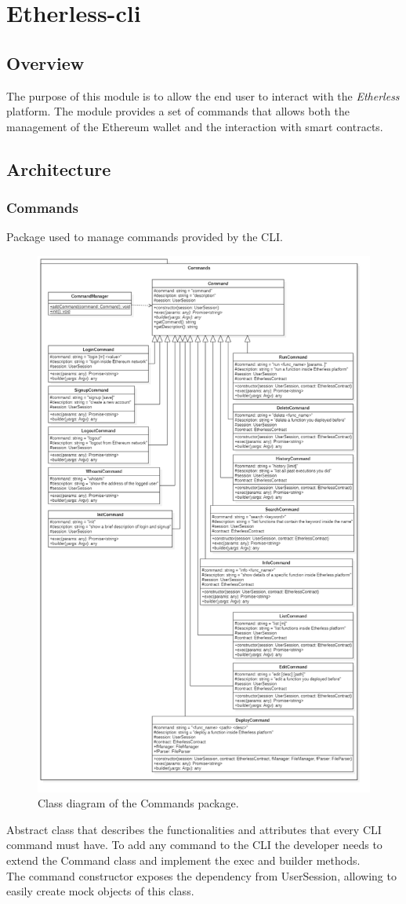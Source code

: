\section{Etherless-cli}	

	\subsection{Overview}
	The purpose of this module is to allow the end user to interact with the \textit{Etherless} platform. The module provides a set of commands that allows both the management of the Ethereum wallet and the interaction with smart contracts.
	
	\subsection{Architecture}
		\subsubsection{Commands}
		Package used to manage commands provided by the CLI.
		\begin{figure} [H]
			\centering
			\includegraphics[width=0.6\linewidth]{diagrammi/etherless-cli/Commands}
			\caption{Class diagram of the Commands package.}
		\end{figure}
	
			Abstract class that describes the functionalities and attributes that every CLI command must have. To add any command to the CLI the developer needs to extend the Command class and implement the exec and builder methods. \\ 
			The command constructor exposes the dependency from UserSession, allowing to easily create mock objects of this class. 
			
